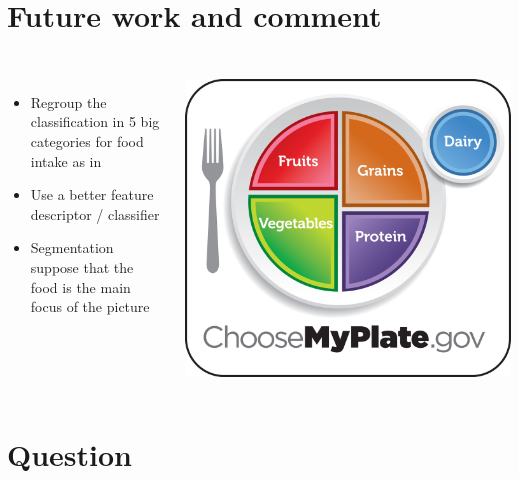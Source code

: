 \documentclass[aspectratio=169]{beamer}
\let\oldsection\section
\renewcommand{\section}[1]{
    \oldsection{#1}	
    \subsection{}
}
\newenvironment{myframe}[1][t]{\begin{frame}[#1]{\secname}{\subsecname}}{\end{frame}}
\begin{document}
    \section{Future work and comment}
    
    \begin{myframe}
        \begin{columns}
            \renewcommand{\baselinestretch}{1.5}\normalsize
            \begin{itemize}
                \item Regroup the classification in 5 big categories for food intake as in \cite{Aizawa2013}
                
                \item Use a better feature descriptor / classifier
                
                \item Segmentation suppose that the food is the main focus of the picture
            \end{itemize}
            \centering
            \includegraphics[scale=0.25]{../img/choosemyplate.jpg}
        \end{columns}
        
    \end{myframe}
    
     \section{Question}
    
\end{document}
